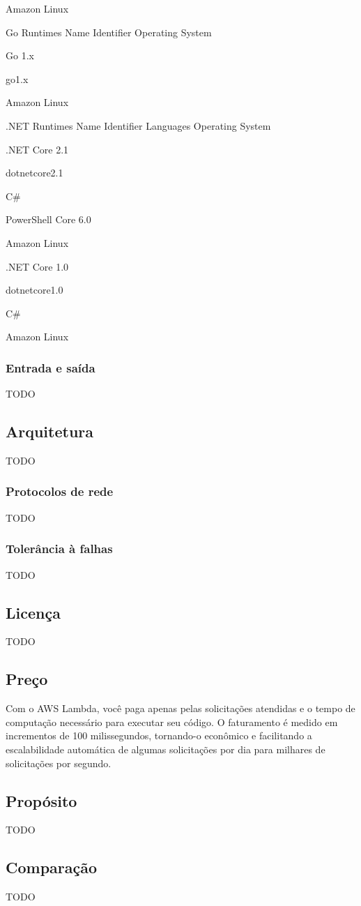 Amazon Linux

Go Runtimes
Name	Identifier	Operating System

Go 1.x

go1.x

Amazon Linux

.NET Runtimes
Name	Identifier	Languages	Operating System

.NET Core 2.1

dotnetcore2.1

C\#

PowerShell Core 6.0

Amazon Linux

.NET Core 1.0

dotnetcore1.0

C\#

Amazon Linux

\subsubsection{Entrada e saída}

TODO

\subsection{Arquitetura}

TODO

\subsubsection{Protocolos de rede}

TODO

\subsubsection{Tolerância à falhas}

TODO

\subsection{Licença}

TODO

\subsection{Preço}

Com o AWS Lambda, você paga apenas pelas solicitações atendidas e o tempo de
computação necessário para executar seu código. O faturamento é medido em
incrementos de 100 milissegundos, tornando-o econômico e facilitando a
escalabilidade automática de algumas solicitações por dia para milhares de
solicitações por segundo.

\subsection{Propósito}

TODO

\subsection{Comparação}

TODO
